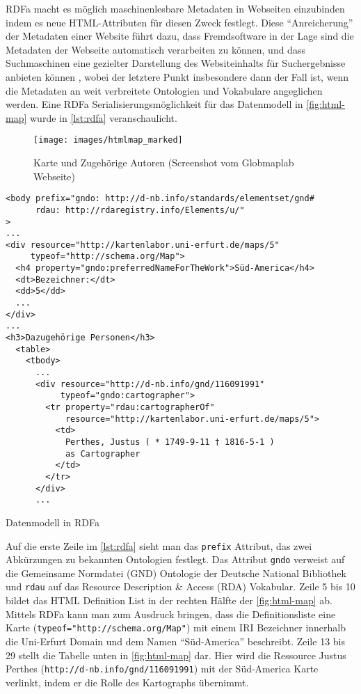 RDFa macht es möglich maschinenlesbare Metadaten in Webseiten einzubinden indem es neue HTML-Attributen für diesen Zweck festlegt. Diese \hyphenquote{german}{Anreicherung} der Metadaten einer Website führt dazu, dass Fremdsoftware in der Lage sind die Metadaten der Webseite automatisch verarbeiten zu können, und dass Suchmaschinen eine gezielter Darstellung des Websiteinhalts für Suchergebnisse anbieten können \parencite[vgl.][Abs.~2]{Schreiber:14:RP}, wobei der letztere Punkt insbesondere dann der Fall ist, wenn die Metadaten an weit verbreitete Ontologien und Vokabulare angeglichen werden. Eine RDFa Serialisierungsmöglichkeit für das Datenmodell in \autoref{fig:html-map} wurde in \autoref{lst:rdfa} veranschaulicht.

\begin{figure}[h]
	\centering
	\texttt{[image: images/htmlmap\_marked]}
	\caption[Karte und Zugehörige Autoren]{Karte und Zugehörige Autoren (Screenshot vom Globmaplab Webseite)}
	\label{fig:html-map}
\end{figure}

\begin{listing}[H]
\begin{verbatim}
<body prefix="gndo: http://d-nb.info/standards/elementset/gnd#
      rdau: http://rdaregistry.info/Elements/u/"
>
...
<div resource="http://kartenlabor.uni-erfurt.de/maps/5"
     typeof="http://schema.org/Map">
  <h4 property="gndo:preferredNameForTheWork">Süd-America</h4>	
  <dt>Bezeichner:</dt>
  <dd>5</dd>
  ...
</div>
...
<h3>Dazugehörige Personen</h3>
  <table>
    <tbody>
      ...
      <div resource="http://d-nb.info/gnd/116091991"
           typeof="gndo:cartographer">
        <tr property="rdau:cartographerOf" 
            resource="http://kartenlabor.uni-erfurt.de/maps/5">
          <td>
            Perthes, Justus ( * 1749-9-11 † 1816-5-1 ) 
            as Cartographer
          </td>
        </tr>
      </div>
      ...
\end{verbatim}
\caption{Datenmodell in RDFa}
\label{lst:rdfa}
\end{listing}

Auf die erste Zeile im \autoref{lst:rdfa} sieht man das \texttt{prefix} Attribut, das zwei Abkürzungen zu bekannten Ontologien festlegt. Das Attribut \texttt{gndo} verweist auf die Gemeinsame Normdatei (GND) Ontologie der Deutsche National Bibliothek und \texttt{rdau} auf das Resource Description \& Access (RDA) Vokabular.  Zeile 5 bis 10 bildet das HTML Definition List in der rechten Hälfte der \autoref{fig:html-map} ab. Mittels RDFa kann man zum Ausdruck bringen, dass die Definitionsliste eine Karte (\texttt{typeof="http://schema.org/Map"}) mit einem IRI Bezeichner innerhalb die Uni-Erfurt Domain und dem Namen \hyphenquote{german}{Süd-America} beschreibt. Zeile 13 bis 29 stellt die Tabelle unten in \autoref{fig:html-map} dar. Hier wird die Ressource Justus Perthes (\texttt{http://d-nb.info/gnd/116091991}) mit der Süd-America Karte verlinkt, indem er die Rolle des Kartographs übernimmt. 